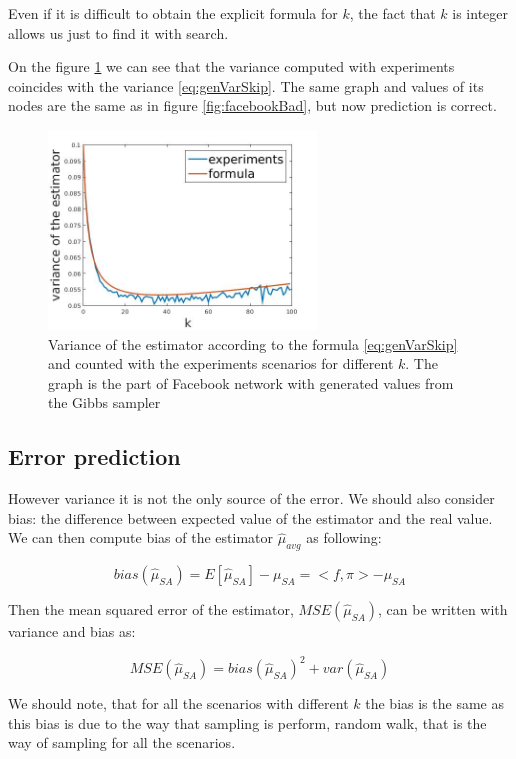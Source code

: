 \documentclass[12pt]{report}
\begin{document}
Even if it is difficult to obtain the explicit formula for $k$, the fact that $k$ is integer allows us just to find it with search.

On the figure \ref{fig:facebookGood} we can see that the variance computed with experiments coincides with the variance \ref{eq:genVarSkip}. The same graph and values of its nodes are the same as in figure \ref{fig:facebookBad}, but now prediction is correct.

\begin{figure}[ht]
    \centering
    \includegraphics[height=200px]{facebookGood}
    \caption{Variance of the estimator according to the formula \ref{eq:genVarSkip} and counted with the experiments scenarios for different $k$. The graph is the part of Facebook network \cite{Facebook} with generated values from the Gibbs sampler}
    \label{fig:facebookGood}
\end{figure}


\subsection{Error prediction}

However variance it is not the only source of the error. We should also consider bias: the difference between expected value of the estimator and the real value. We can then compute bias of the estimator $\hat{\mu}_{avg}$ as following:

$$bias(\hat{\mu}_{SA}) = E[\hat{\mu}_{SA}] - \mu_{SA} = <f, \pi> - \mu_{SA}$$

Then the mean squared error of the estimator, $MSE(\hat{\mu}_{SA})$, can be written with variance and bias as: 

$$MSE(\hat{\mu}_{SA}) = bias(\hat{\mu}_{SA})^2 + var(\hat{\mu}_{SA})$$

We should note, that for all the scenarios with different $k$ the bias is the same as this bias is due to the way that sampling is perform, random walk, that is the way of sampling for all the scenarios.
\end{document}
